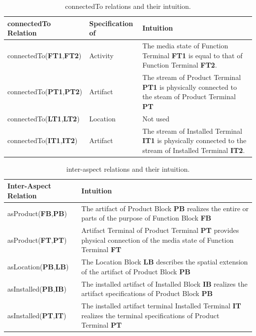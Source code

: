 \begin{table}[htb]\centering\caption{connectedTo relations and their intuition.}\label{tab:Table 12}
  \begin{supertabular}{|m{1.2962599in}|m{1.0038599in}|m{3.80596in}|}
    \hline
    \textbf{connectedTo Relation} &
    {\bfseries Specification of} &
    {\bfseries Intuition}\\\hline
    connectedTo(\textbf{FT1},\textbf{FT2}) &
    Activity &
    The media state of Function Terminal \textbf{FT1} is equal to that of Function Terminal \textbf{FT2}.\\\hline
    connectedTo(\textbf{PT1},\textbf{PT2})

    &
    Artifact &
    The stream of Product Terminal \textbf{PT1} is physically connected to the steam of Product Terminal \textbf{PT}

    \\\hline
    connectedTo(\textbf{LT1},\textbf{LT2})

    &
    Location &
    Not used

    \\\hline
    connectedTo(\textbf{IT1},\textbf{IT2})

    &
    Artifact &
    The stream of Installed Terminal \textbf{IT1} is physically connected to the stream of Installed Terminal
    \textbf{IT2}.\\\hline
  \end{supertabular}
\end{table}

\begin{table}[htb]\centering\caption{inter-aspect relations and their intuition.}\label{tab:Table 13}
  \begin{supertabular}{|m{1.2962599in}|m{4.85036in}|}
    \hline
    {\bfseries Inter-Aspect Relation} &
    {\bfseries Intuition}\\\hline
    asProduct(\textbf{FB},\textbf{PB}) &
    The artifact of Product Block\textbf{ PB} realizes the entire or parts of the purpose of Function Block\textbf{
      FB}\\\hline
    asProduct(\textbf{FT},\textbf{PT}) &
    Artifact Terminal of Product Terminal \textbf{PT} provides physical connection of the media state of Function Terminal
    \textbf{FT}\\\hline
    asLocation(\textbf{PB},\textbf{LB}) &
    The Location Block \textbf{LB }describes the spatial extension of the artifact of Product Block \textbf{PB}\\\hline
    asInstalled(\textbf{PB},\textbf{IB}) &
    The installed artifact of Installed Block \textbf{IB} realizes the artifact specifications of Product Block
    \textbf{PB}\\\hline
    asInstalled(\textbf{PT},\textbf{IT}) &
    The installed artifact terminal Installed Terminal \textbf{IT} realizes the terminal specifications of Product
    Terminal \textbf{PT}\\\hline
  \end{supertabular}
\end{table}

